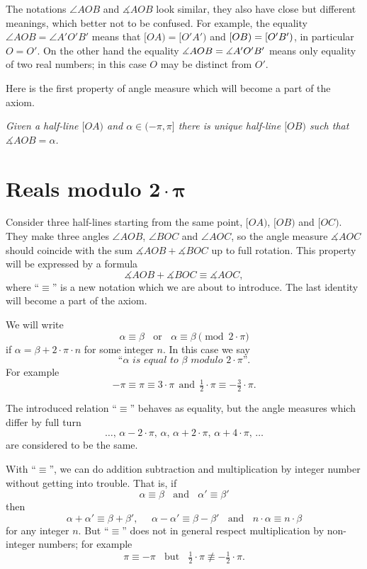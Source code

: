 The notations $\angle AOB$ and $\measuredangle AOB$ look similar,
they also have close but different meanings, 
which better not to be confused.
For example, the equality 
$\angle AOB=\angle A'O'B'$
means that
$[OA)=[O'A')$ and $[OB)\z=[O'B')$,
in particular $O=O'$.
On the other hand the equality 
$\measuredangle AOB\z=\measuredangle A'O'B'$ 
means only equality of two real numbers;
in this case $O$ may be distinct from $O'$.

Here is the first property of angle measure which will become a part of the axiom.

\textit{Given a half-line $[O A)$ and $\alpha\in(-\pi,\pi]$ there is unique  half-line $[O B)$ such that $\measuredangle A O B= \alpha$.}





\section*{Reals modulo $\bm{2\cdot\pi}$}

Consider three half-lines starting from the same point,
 $[O A)$, $[O B)$ and $[O C)$.
They make three angles $\angle A O B$, $\angle B O C$ and $\angle A O C$,
so the angle measure $\measuredangle A O C$ should coincide with
the sum $\measuredangle A O B+\measuredangle B O C$ up to full rotation.
This property will be expressed by a formula 
$$\measuredangle A O B+\measuredangle B O C\equiv \measuredangle A O C,$$
where ``$\equiv$'' is a new notation which we are about to introduce.
The last identity will become a part of the axiom.

We will write 
$$\alpha\equiv\beta\ \ \ \ \text{or}\ \ \ \  \alpha\equiv\beta\pmod{2\cdot\pi}$$ if $\alpha=\beta+2\cdot\pi\cdot n$
for some integer $n$.
In this case we say 
$$\textit{``$\alpha$ is equal to $\beta$ modulo $2\cdot\pi$''}.$$
For example 
$$-\pi\equiv \pi\equiv 3\cdot\pi\ \  \text{and}
\ \ \tfrac12\cdot\pi\equiv-\tfrac32\cdot\pi.$$

The introduced relation ``$\equiv$'' behaves as equality, 
but the angle measures which differ by full turn 
\[\dots,\,\alpha-2\cdot\pi,\, \alpha,\, \alpha+2\cdot\pi,\, \alpha+4\cdot\pi,\,\dots\] 
are considered to be the same.

With ``$\equiv$'', we can do addition subtraction and multiplication by integer number without getting into trouble.
That is, if
$$\alpha\equiv\beta\ \ \ \ \text{and}\ \ \ \ \alpha'\equiv \beta'$$ 
then
$$\alpha+\alpha'\equiv\beta+\beta',\ \ \ \ \ \ \alpha-\alpha'\equiv \beta-\beta'\ \ \ \ 
\text{and}\ \ \ \ n\cdot\alpha\equiv n\cdot\beta$$
for any integer $n$.
But ``$\equiv$'' does not in general respect multiplication by non-integer numbers; for example 
$$\pi\equiv -\pi\ \ \ \ \text{but}\ \ \ \ \tfrac12\cdot\pi\not\equiv -\tfrac12\cdot\pi.$$ 

